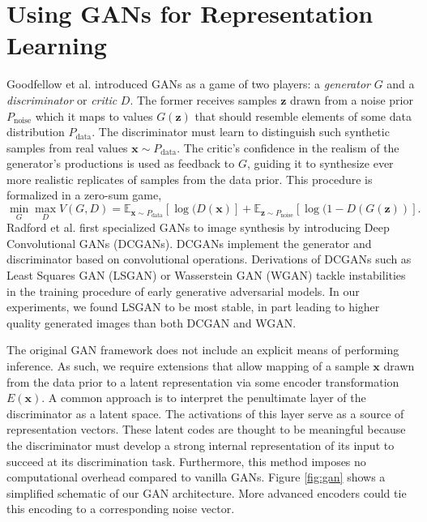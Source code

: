 \documentclass{article}
\begin{document}
\section{Using GANs for Representation Learning}
Goodfellow et al. \cite{goodfellow2014generative} introduced GANs as a game of
two players: a \emph{generator} $G$ and a \emph{discriminator} or \emph{critic} $D$. The former receives samples $\mathbf{z}$ drawn from a noise prior $P_{\text{noise}}$ which it maps to values $G(\mathbf{z})$ that should resemble elements of some data distribution $P_{\text{data}}$. The discriminator must learn to distinguish such synthetic samples from real values $\mathbf{x} \sim P_{\text{data}}$. The critic's confidence in the realism of the generator's productions is used as feedback to $G$, guiding it to synthesize ever more realistic replicates of samples from the data prior. This procedure is formalized in a zero-sum game,
\vspace{-1pt}
$$\min_G \max_D V(G, D) = \mathbb{E}_{\mathbf{x} \sim P_{\text{data}}}[\log(D(\mathbf{x})] + \mathbb{E}_{\mathbf{z} \sim P_{\text{noise}}}[\log(1 - D(G(\mathbf{z}))].$$
\vspace{-2pt}
Radford et al. \cite{radford2015unsupervised} first specialized GANs to image synthesis by introducing Deep Convolutional GANs (DCGANs). DCGANs implement the generator and discriminator based on convolutional operations. Derivations of DCGANs such as Least Squares GAN (LSGAN) \cite{mao2016least} or Wasserstein GAN (WGAN) \cite{arjovsky2017wasserstein} tackle instabilities in the training procedure of early generative adversarial models. In our experiments, we found LSGAN to be most stable, in part leading to higher quality generated images than both DCGAN and WGAN.

The original GAN framework does not include an explicit means of performing inference. As such, we require extensions that allow mapping of a sample $\mathbf{x}$ drawn from the data prior to a latent representation via some encoder transformation $E(\mathbf{x})$. A common approach is to interpret the penultimate layer of the discriminator as a latent space. The activations of this layer serve as a source of representation vectors. These latent codes are thought to be meaningful because the discriminator must develop a strong internal representation of its input to succeed at its discrimination task. Furthermore, this method imposes no computational overhead compared to vanilla GANs. Figure \ref{fig:gan} shows a simplified schematic of our GAN architecture. More advanced encoders could tie this encoding to a corresponding noise vector.
\end{document}

